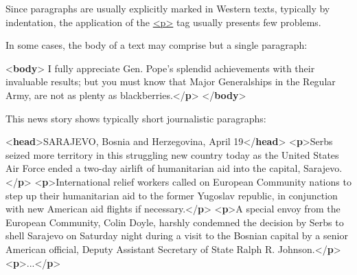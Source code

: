 Since paragraphs are usually explicitly marked in Western texts, typically by indentation, the application of the \hyperref[TEI.p]{<p>} tag usually presents few problems.\par
In some cases, the body of a text may comprise but a single paragraph: \par\bgroup{}\exampleFont \begin{shaded}\noindent\mbox{}{<\textbf{body}>}\mbox{}\newline 
{}I fully appreciate Gen. Pope's splendid achievements with their\mbox{}\newline 
\hspace*{1em}\hspace*{1em} invaluable results; but you must know that Major Generalships in the\mbox{}\newline 
\hspace*{1em}\hspace*{1em} Regular Army, are not as plenty as blackberries.{</\textbf{p}>}\mbox{}\newline 
{</\textbf{body}>}\end{shaded}\egroup\par \par
This news story shows typically short journalistic paragraphs: \par\bgroup{}\exampleFont \begin{shaded}\noindent\mbox{}{<\textbf{head}>}SARAJEVO, Bosnia and Herzegovina, April 19{</\textbf{head}>}\mbox{}\newline 
{<\textbf{p}>}Serbs seized more territory in this struggling new country today as\mbox{}\newline 
 the United States Air Force ended a two-day airlift of humanitarian\mbox{}\newline 
 aid into the capital, Sarajevo.{</\textbf{p}>}\mbox{}\newline 
{<\textbf{p}>}International relief workers called on European Community nations\mbox{}\newline 
 to step up their humanitarian aid to the former Yugoslav republic,\mbox{}\newline 
 in conjunction with new American aid flights if necessary.{</\textbf{p}>}\mbox{}\newline 
{<\textbf{p}>}A special envoy from the European Community, Colin Doyle, harshly\mbox{}\newline 
 condemned the decision by Serbs to shell Sarajevo on Saturday night\mbox{}\newline 
 during a visit to the Bosnian capital by a senior American official,\mbox{}\newline 
 Deputy Assistant Secretary of State Ralph R. Johnson.{</\textbf{p}>}\mbox{}\newline 
{<\textbf{p}>}...{</\textbf{p}>}\end{shaded}\egroup\par \par
